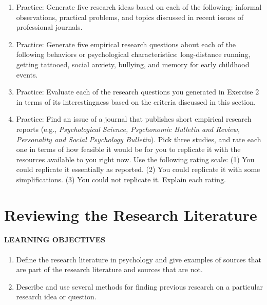 \documentclass[
]{krantz}
\providecommand{\tightlist}{%
  \setlength{\itemsep}{0pt}\setlength{\parskip}{0pt}}
\begin{document}
\begin{enumerate}
\def\labelenumi{\arabic{enumi}.}
\tightlist
\item
  Practice: Generate five research ideas based on each of the following: informal observations, practical problems, and topics discussed in recent issues of professional journals.
\item
  Practice: Generate five empirical research questions about each of the following behaviors or psychological characteristics: long-distance running, getting tattooed, social anxiety, bullying, and memory for early childhood events.
\item
  Practice: Evaluate each of the research questions you generated in Exercise 2 in terms of its interestingness based on the criteria discussed in this section.
\item
  Practice: Find an issue of a journal that publishes short empirical research reports (e.g., \emph{Psychological Science, Psychonomic Bulletin and Review, Personality and Social Psychology Bulletin}). Pick three studies, and rate each one in terms of how feasible it would be for you to replicate it with the resources available to you right now. Use the following rating scale: (1) You could replicate it essentially as reported. (2) You could replicate it with some simplifications. (3) You could not replicate it. Explain each rating.
\end{enumerate}

\section{Reviewing the Research Literature}\label{reviewing-the-research-literature}

\paragraph*{LEARNING OBJECTIVES}\label{learning-objectives-26}

\begin{enumerate}
\def\labelenumi{\arabic{enumi}.}
\tightlist
\item
  Define the research literature in psychology and give examples of sources that are part of the research literature and sources that are not.
\item
  Describe and use several methods for finding previous research on a particular research idea or question.
\end{enumerate}
\end{document}
